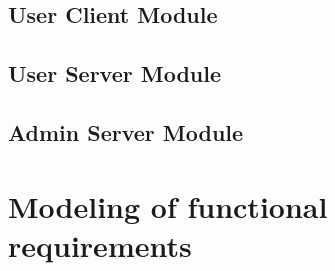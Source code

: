 \documentclass{article}
\begin{document}
\subsection{User Client Module}

\subsection{User Server Module}

\subsection{Admin Server Module}

\section{Modeling of functional requirements}
\end{document}
